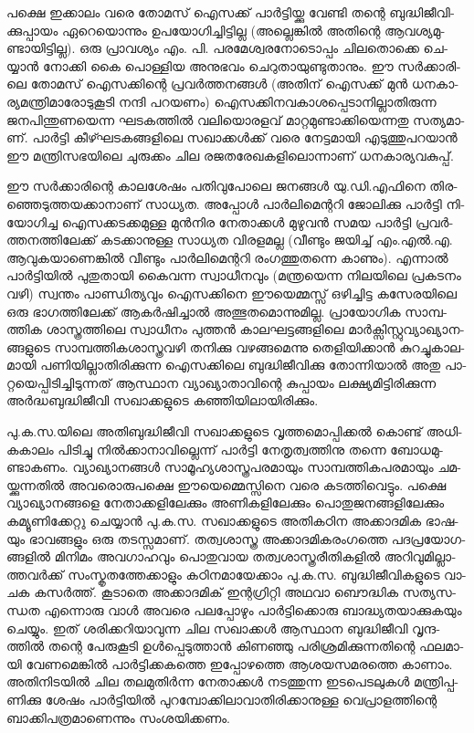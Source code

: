 ­പ­ക്ഷെ ഇക്കാ­ലം വരെ തോ­മ­സ് ഐസ­ക്ക് പാര്‍­ട്ടി­യ്ക്കു വേ­ണ്ടി തന്റെ ബു­ദ്ധി­ജീ­വി­ക്കു­പ്പാ­യം ഏറെ­യൊ­ന്നും ഉപ­യോ­ഗി­ച്ചി­ട്ടി­ല്ല 
(അ­ല്ലെ­ങ്കില്‍ അതി­ന്റെ ആവ­ശ്യ­മു­ണ്ടാ­യി­ട്ടി­ല്ല). ഒരു പ്രാ­വ­ശ്യം എം. പി. പര­മേ­ശ്വ­ര­നോ­ടൊ­പ്പം ചി­ല­തൊ­ക്കെ ചെ­യ്യാന്‍ നോ­ക്കി
കൈ പൊ­ള്ളിയ അനു­ഭ­വം ചെ­റു­താ­യു­ണ്ടു­താ­നും. ഈ സര്‍­ക്കാ­രി­ലെ തോ­മ­സ് ഐസ­ക്കി­ന്റെ പ്ര­വര്‍­ത്ത­ന­ങ്ങള്‍ (അ­തി­ന്
ഐസ­ക്ക് മുന്‍ ധന­കാ­ര്യ­മ­ന്ത്രി­മാ­രോ­ടു­കൂ­ടി നന്ദി പറ­യ­ണം) ഐസ­ക്കി­ന­വ­കാ­ശ­പ്പെ­ടാ­നി­ല്ലാ­തി­രു­ന്ന ജന­പി­ന്തു­ണ­യെ­ന്ന 
ഘട­ക­ത്തില്‍ വലി­യൊ­ര­ള­വ് മാ­റ്റ­മു­ണ്ടാ­ക്കി­യെ­ന്ന­തു സത്യ­മാ­ണ്. പാര്‍­ട്ടി കീ­ഴ്ഘ­ട­ക­ങ്ങ­ളി­ലെ സഖാ­ക്കള്‍­ക്ക് വരെ നേ­ട്ട­മാ­യി
എടു­ത്തു­പ­റ­യാന്‍ ഈ മന്ത്രി­സ­ഭ­യി­ലെ ചു­രു­ക്കം ചില രജ­ത­രേ­ഖ­ക­ളി­ലൊ­ന്നാ­ണ് ധന­കാ­ര്യ­വ­കു­പ്പ്.

ഈ സര്‍­ക്കാ­രി­ന്റെ കാ­ല­ശേ­ഷം പതി­വു­പോ­ലെ ജന­ങ്ങള്‍ യു­.­ഡി­.എ­ഫി­നെ തി­ര­ഞ്ഞെ­ടു­ത്ത­യ­ക്കാ­നാ­ണ് സാ­ധ്യ­ത. അപ്പോള്‍
പാര്‍­ലി­മെ­ന്റ­റി ജോ­ലി­ക്കു പാര്‍­ട്ടി നി­യോ­ഗി­ച്ച ഐസ­ക്ക­ട­ക്ക­മു­ള്ള മുന്‍­നിര നേ­താ­ക്കള്‍ മു­ഴു­വന്‍ സമയ പാര്‍­ട്ടി 
പ്ര­വര്‍­ത്ത­ന­ത്തി­ലേ­ക്ക് കട­ക്കാ­നു­ള്ള സാ­ധ്യത വി­ര­ള­മ­ല്ല (വീ­ണ്ടും ജയി­ച്ച് എം­.എല്‍.എ. ആവു­ക­യാ­ണെ­ങ്കില്‍ വീ­ണ്ടും 
പാര്‍­ലി­മെ­ന്റ­റി രം­ഗ­ത്തു­ത­ന്നെ കാ­ണും­). എന്നാല്‍ പാര്‍­ട്ടി­യില്‍ പു­തു­താ­യി കൈ­വ­ന്ന സ്വാ­ധീ­ന­വും (മ­ന്ത്ര­യെ­ന്ന നി­ല­യി­ലെ 
പ്ര­ക­ട­നം വഴി) സ്വ­ന്തം പാ­ണ്ഡി­ത്യ­വും ഐസ­ക്കി­നെ ഈയെ­മ്മ­സ്സ് ഒഴി­ച്ചി­ട്ട കസേ­ര­യി­ലെ ഒരു ഭാ­ഗ­ത്തി­ലേ­ക്ക് ആകര്‍­ഷി­ച്ചാല്‍
അത്ഭു­ത­മൊ­ന്നു­മി­ല്ല. പ്രാ­യോ­ഗിക സാ­മ്പ­ത്തിക ശാ­സ്ത്ര­ത്തി­ലെ സ്വാ­ധീ­നം പു­ത്തന്‍ കാ­ല­ഘ­ട്ട­ങ്ങ­ളി­ലെ 
മാര്‍­ക്സി­സ്റ്റു­വ്യാ­ഖ്യാ­ന­ങ്ങ­ളു­ടെ സാ­മ്പ­ത്തി­ക­ശാ­സ്ത്ര­വ­ഴി തനി­ക്കു വഴ­ങ്ങ­മെ­ന്നു തെ­ളി­യി­ക്കാന്‍ കു­റ­ച്ചു­കാ­ല­മാ­യി 
പണി­യി­ല്ലാ­തി­രി­ക്കു­ന്ന ഐസ­ക്കി­ലെ ബു­ദ്ധി­ജീ­വി­ക്കു തോ­ന്നി­യാല്‍ അതു പാ­റ്റ­യെ­പ്പി­ടി­ച്ചി­ടു­ന്ന­ത് ആസ്ഥാന വ്യാ­ഖ്യാ­താ­വി­ന്റെ 
കു­പ്പാ­യം ലക്ഷ്യ­മി­ട്ടി­രി­ക്കു­ന്ന അര്‍­ദ്ധ­ബു­ദ്ധി­ജീ­വി സഖാ­ക്ക­ളു­ടെ കഞ്ഞി­യി­ലാ­യി­രി­ക്കും­.

­പു­.­ക.­സ.­യി­ലെ അതി­ബു­ദ്ധി­ജീ­വി സഖാ­ക്ക­ളു­ടെ വൃ­ത്ത­മൊ­പ്പി­ക്കല്‍ കൊ­ണ്ട് അധി­ക­കാ­ലം പി­ടി­ച്ചു നില്‍­ക്കാ­നാ­വി­ല്ലെ­ന്ന് 
പാര്‍­ട്ടി നേ­തൃ­ത്വ­ത്തി­നു തന്നെ ബോ­ധ­മു­ണ്ടാ­ക­ണം. വ്യാ­ഖ്യാ­ന­ങ്ങള്‍ സാ­മൂ­ഹ്യ­ശാ­സ്ത്ര­പ­ര­മാ­യും സാ­മ്പ­ത്തി­ക­പ­ര­മാ­യും 
ചമ­യ്ക്കു­ന്ന­തില്‍ അവ­രൊ­രു­പ­ക്ഷെ ഈയെ­മ്മെ­സ്സി­നെ വരെ കട­ത്തി­വെ­ട്ടും. പക്ഷെ വ്യാ­ഖ്യാ­ന­ങ്ങ­ളെ നേ­താ­ക്ക­ളി­ലേ­ക്കും 
അണി­ക­ളി­ലേ­ക്കും പൊ­തു­ജ­ന­ങ്ങ­ളി­ലേ­ക്കും കമ്യൂ­ണി­ക്കേ­റ്റു ചെ­യ്യാന്‍ പു­.­ക.­സ. സഖാ­ക്ക­ളു­ടെ അതി­ക­ഠിന അക്കാ­ദ­മിക ഭാ­ഷ­യും
ഭാ­വ­ങ്ങ­ളും ഒരു തട­സ്സ­മാ­ണ്. തത്വ­ശാ­സ്ത്ര അക്കാ­ദ­മി­ക­രം­ഗ­ത്തെ പദ­പ്ര­യോ­ഗ­ങ്ങ­ളില്‍ മി­നി­മം അവ­ഗാ­ഹ­വും പൊ­തു­വായ 
തത്വ­ശാ­സ്ത്ര­രീ­തി­ക­ളില്‍ അറി­വു­മി­ല്ലാ­ത്ത­വര്‍­ക്ക് സം­സ്കൃ­ത­ത്തേ­ക്കാ­ളും കഠി­ന­മാ­യേ­ക്കാം പു­.­ക.­സ. ബു­ദ്ധി­ജീ­വി­ക­ളു­ടെ വാ­ചക
കസര്‍­ത്ത്. കൂ­ടാ­തെ അക്കാ­ദ­മി­ക് ഇന്റ­ഗ്രി­റ്റി അഥ­വാ ബൌ­ദ്ധിക സത്യ­സ­ന്ധത എന്നൊ­രു വാള്‍ അവ­രെ പല­പ്പോ­ഴും 
പാര്‍­ട്ടി­ക്കൊ­രു ബാ­ദ്ധ്യ­ത­യാ­ക്കു­ക­യും ചെ­യ്യും. ഇത് ശരി­ക്ക­റി­യാ­വു­ന്ന ചില സഖാ­ക്കള്‍ ആസ്ഥാന ബു­ദ്ധി­ജീ­വി വൃ­ന്ദ­ത്തില്‍ 
തന്റെ പേ­രു­കൂ­ടി ഉള്‍­പ്പെ­ടു­ത്താന്‍ കി­ണ­ഞ്ഞു പരി­ശ്ര­മി­ക്കു­ന്ന­തി­ന്റെ ഫല­മാ­യി വേ­ണ­മെ­ങ്കില്‍ പാര്‍­ട്ടി­ക്ക­ക­ത്തെ ഇപ്പോ­ഴ­ത്തെ
ആശ­യ­സ­മ­ര­ത്തെ കാ­ണാം. അതി­നി­ട­യില്‍ ചില തല­മു­തിര്‍­ന്ന നേ­താ­ക്കള്‍ നട­ത്തു­ന്ന ഇട­പെ­ട­ലു­കള്‍ മന്ത്രി­പ്പ­ണി­ക്കു ശേ­ഷം
പാര്‍­ട്ടി­യില്‍ പു­റ­മ്പോ­ക്കി­ലാ­വാ­തി­രി­ക്കാ­നു­ള്ള വെ­പ്രാ­ള­ത്തി­ന്റെ ബാ­ക്കി­പ­ത്ര­മാ­ണെ­ന്നും സം­ശ­യി­ക്ക­ണം­.


